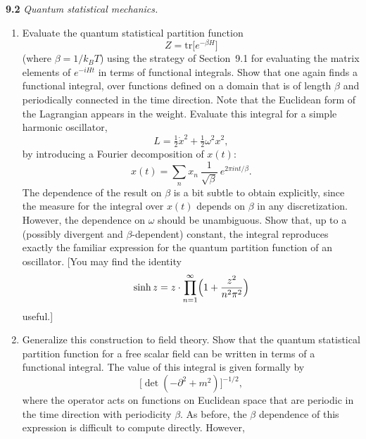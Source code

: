 \textbf{9.2} \emph{Quantum statistical mechanics.}
\begin{enumerate}[label=(\alph*)]
  \item Evaluate the quantum statistical partition function
    \begin{equation}
      Z = \mathrm{tr}\bigl[ e^{-\beta H} \bigr]
    \end{equation}
    (where $\beta = 1/k_BT$) using the strategy of Section~9.1 for evaluating
    the matrix elements of $e^{-iHt}$ in terms of functional integrals.  Show
    that one again finds a functional integral, over functions defined on a
    domain that is of length $\beta$ and periodically connected in the time
    direction.  Note that the Euclidean form of the Lagrangian appears in the
    weight.  Evaluate this integral for a simple harmonic oscillator,
    \begin{equation}
      L = \tfrac{1}{2}\dot{x}^2 + \tfrac{1}{2}\omega^2x^2 ,
    \end{equation}
    by introducing a Fourier decomposition of $x(t)$:
    \begin{equation}
      x(t) = \sum_n x_n\ \frac{1}{\sqrt{\beta}}\ e^{2\pi int/\beta} .
    \end{equation}
    The dependence of the result on $\beta$ is a bit subtle to obtain
    explicitly, since the measure for the integral over $x(t)$ depends on
    $\beta$ in any discretization.  However, the dependence on $\omega$ should
    be unambiguous.  Show that, up to a (possibly divergent and
    $\beta$-dependent) constant, the integral reproduces exactly the familiar
    expression for the quantum partition function of an oscillator.  [You may
    find the identity
    \begin{equation}
      \sinh z = z\cdot\prod_{n=1}^{\infty}\Bigl( 1 + \frac{z^2}{n^2\pi^2}
        \Bigr)
    \end{equation}
    useful.]
  \item Generalize this construction to field theory.  Show that the quantum
    statistical partition function for a free scalar field can be written in
    terms of a functional integral.  The value of this integral is given
    formally by
    \begin{equation}
      \bigl[ \det(-\partial^2+m^2) \bigr]^{-1/2} ,
    \end{equation}
    where the operator acts on functions on Euclidean space that are periodic
    in the time direction with periodicity $\beta$.  As before, the $\beta$
    dependence of this expression is difficult to compute directly.  However,

\end{enumerate}

